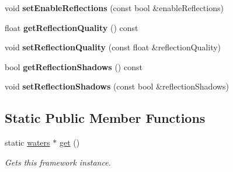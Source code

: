\begin{DoxyCompactItemize}
void {\bfseries set\+Enable\+Reflections} (const bool \&enable\+Reflections)
\item 
\mbox{\label{classflounder_1_1waters_a43b270c4a7ed35a79b62f371287cf04c}} 
float {\bfseries get\+Reflection\+Quality} () const
\item 
\mbox{\label{classflounder_1_1waters_a758c4a4857bef6b874f84db2a0e72a98}} 
void {\bfseries set\+Reflection\+Quality} (const float \&reflection\+Quality)
\item 
\mbox{\label{classflounder_1_1waters_a776fb3b9066841ad560c8f9f1004d35d}} 
bool {\bfseries get\+Reflection\+Shadows} () const
\item 
\mbox{\label{classflounder_1_1waters_af3674353f3d5bac8261a32dea71a7fe0}} 
void {\bfseries set\+Reflection\+Shadows} (const bool \&reflection\+Shadows)
\end{DoxyCompactItemize}
\subsection*{Static Public Member Functions}
\begin{DoxyCompactItemize}
\item 
static \hyperlink{classflounder_1_1waters}{waters} $\ast$ \hyperlink{classflounder_1_1waters_a522da05a5715f286c91a453b4a7bc7de}{get} ()
\begin{DoxyCompactList}\small\item\em Gets this framework instance. \end{DoxyCompactList}\end{DoxyCompactItemize}
